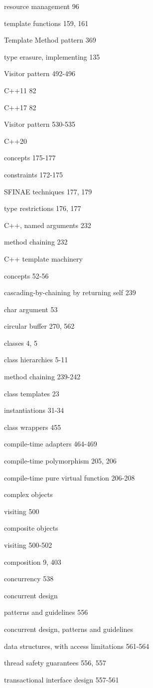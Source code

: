 resource management 96

template functions 159, 161

Template Method pattern 369

type erasure, implementing 135

Visitor pattern 492-496

C++11 82

C++17 82

Visitor pattern 530-535

C++20

concepts 175-177

constraints 172-175

SFINAE techniques 177, 179

type restrictions 176, 177

C++, named arguments 232

method chaining 232

C++ template machinery

concepts 52-56

cascading-by-chaining by returning self 239

char argument 53

circular buffer 270, 562

classes 4, 5

class hierarchies 5-11

method chaining 239-242

class templates 23

instantiations 31-34

class wrappers 455

compile-time adapters 464-469

compile-time polymorphism 205, 206

compile-time pure virtual function 206-208

complex objects

visiting 500

composite objects

visiting 500-502

composition 9, 403

concurrency 538

concurrent design

patterns and guidelines 556

concurrent design, patterns and guidelines

data structures, with access limitations 561-564

thread safety guarantees 556, 557

transactional interface design 557-561

